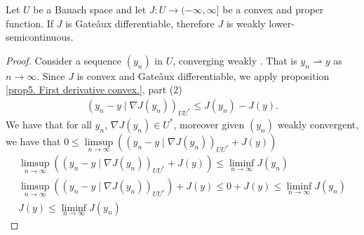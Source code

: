\begin{theorem}
	Let $U$ be a Banach space and let $J:U\rightarrow (-\infty, \infty]$ be a convex and proper function. If $J$ is Gate\^aux differentiable, therefore $J$ is weakly lower-semicontinuous.
	\begin{proof}
		Consider a sequence $(y_n)$ in $U$,  converging weakly . That is $y_n \rightharpoonup y$ as $n\rightarrow \infty$. Since $J$ is convex and Gate\^aux differentiable, we apply proposition \eqref{prop5. First derivative convex.}, part (2)
		\begin{align}
		\left(y_n-y\mid \nabla J(y_n)\right)_{UU^*}\leq J(y_n)-J(y).	
		\end{align}
		We have that for all $y_n$, $\nabla J(y_n) \in U^*$, moreover given $(y_n)$ weakly convergent, we have that $ 0 \leq \underset{n\rightarrow\infty}{\limsup} \left(\left(y_n-y\mid \nabla J(y_n)\right)_{UU^*}+ J(y)\right)$
		\begin{align*}
			\underset{n\rightarrow\infty}{\limsup} \left(\left(y_n-y\mid \nabla J(y_n)\right)_{UU^*}+ J(y)\right)\leq \underset{n\rightarrow\infty}{\liminf}  J(y_n)\\
			\underset{n\rightarrow\infty}{\limsup} \left(\left(y_n-y\mid \nabla J(y_n)\right)_{UU^*}\right)+ J(y)\leq 0+ J(y)\leq \underset{n\rightarrow\infty}{\liminf}  J(y_n)\\
			 J(y)\leq \underset{n\rightarrow\infty}{\liminf}  J(y_n)
		\end{align*} 
	\end{proof}
\end{theorem}



